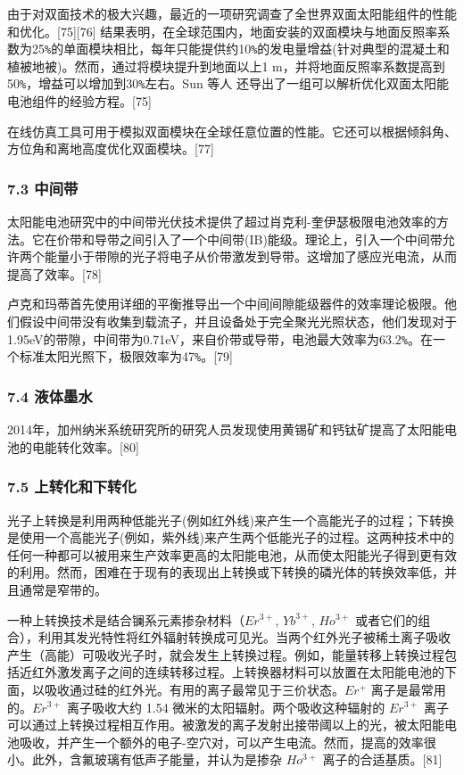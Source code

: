由于对双面技术的极大兴趣，最近的一项研究调查了全世界双面太阳能组件的性能和优化。[75][76] 结果表明，在全球范围内，地面安装的双面模块与地面反照率系数为25\verb`%`的单面模块相比，每年只能提供约10\verb`%`的发电量增益(针对典型的混凝土和植被地被)。然而，通过将模块提升到地面以上1 m，并将地面反照率系数提高到50\verb`%`，增益可以增加到30\verb`%`左右。Sun 等人 还导出了一组可以解析优化双面太阳能电池组件的经验方程。[75]

在线仿真工具可用于模拟双面模块在全球任意位置的性能。它还可以根据倾斜角、方位角和离地高度优化双面模块。[77]

\subsubsection{7.3 中间带}

太阳能电池研究中的中间带光伏技术提供了超过肖克利-奎伊瑟极限电池效率的方法。它在价带和导带之间引入了一个中间带(IB)能级。理论上，引入一个中间带允许两个能量小于带隙的光子将电子从价带激发到导带。这增加了感应光电流，从而提高了效率。[78]

卢克和玛蒂首先使用详细的平衡推导出一个中间间隙能级器件的效率理论极限。他们假设中间带没有收集到载流子，并且设备处于完全聚光光照状态，他们发现对于1.95eV的带隙，中间带为0.71eV，来自价带或导带，电池最大效率为63.2\verb`%`。在一个标准太阳光照下，极限效率为47\verb`%`。[79]

\subsubsection{7.4 液体墨水}

2014年，加州纳米系统研究所的研究人员发现使用黄锡矿和钙钛矿提高了太阳能电池的电能转化效率。[80]

\subsubsection{7.5 上转化和下转化}

光子上转换是利用两种低能光子(例如红外线)来产生一个高能光子的过程；下转换是使用一个高能光子(例如，紫外线)来产生两个低能光子的过程。这两种技术中的任何一种都可以被用来生产效率更高的太阳能电池，从而使太阳能光子得到更有效的利用。然而，困难在于现有的表现出上转换或下转换的磷光体的转换效率低，并且通常是窄带的。

一种上转换技术是结合镧系元素掺杂材料（$Er^{3+}$, $Yb^{3+}$, $Ho^{3+}$ 或者它们的组合），利用其发光特性将红外辐射转换成可见光。当两个红外光子被稀土离子吸收产生（高能）可吸收光子时，就会发生上转换过程。例如，能量转移上转换过程包括近红外激发离子之间的连续转移过程。上转换器材料可以放置在太阳能电池的下面，以吸收通过硅的红外光。有用的离子最常见于三价状态。$Er^{+}$ 离子是最常用的。$Er^{3+}$ 离子吸收大约 1.54 微米的太阳辐射。两个吸收这种辐射的 $Er^{3+}$ 离子可以通过上转换过程相互作用。被激发的离子发射出接带阈以上的光，被太阳能电池吸收，并产生一个额外的电子-空穴对，可以产生电流。然而，提高的效率很小。此外，含氟玻璃有低声子能量，并认为是掺杂 $Ho^{3+}$ 离子的合适基质。[81]

